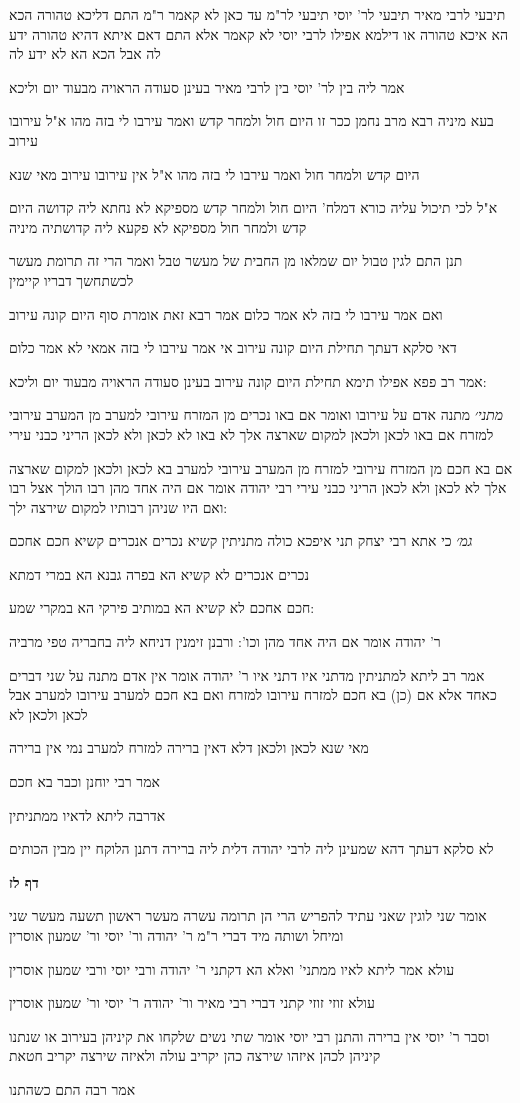 \documentclass[12pt, openany]{book}
\newcommand{\sethebfont}{
\fontsize{10.5pt}{21.0pt} \selectfont
}
\newcommand{\textblock}[1]{
{\sethebfont #1\\}	
}
\newcommand{\sectname}{}
\newcommand{\newsection}[1]{
	\addcontentsline{toc}{section}{#1}
	\renewcommand{\sectname}{#1}	
	\vspace{-\baselineskip}
	\begin{center}
		\textbf{%
\fontsize{16pt}{16pt}\selectfont
			#1}
	\end{center}
	\vspace{-\baselineskip}
	\nopagebreak
}
\begin{document}
\textblock{תיבעי לרבי מאיר תיבעי לר' יוסי תיבעי לר"מ עד כאן לא קאמר ר"מ התם דליכא טהורה הכא הא איכא טהורה או דילמא אפילו לרבי יוסי לא קאמר אלא התם דאם איתא דהיא טהורה ידע לה אבל הכא הא לא ידע לה}
\textblock{אמר ליה בין לר' יוסי בין לרבי מאיר בעינן סעודה הראויה מבעוד יום וליכא}
\textblock{בעא מיניה רבא מרב נחמן ככר זו היום חול ולמחר קדש ואמר עירבו לי בזה מהו א"ל עירובו עירוב}
\textblock{היום קדש ולמחר חול ואמר עירבו לי בזה מהו א"ל אין עירובו עירוב מאי שנא}
\textblock{א"ל לכי תיכול עליה כורא דמלח' היום חול ולמחר קדש מספיקא לא נחתא ליה קדושה היום קדש ולמחר חול מספיקא לא פקעא ליה קדושתיה מיניה}
\textblock{תנן התם לגין טבול יום שמלאו מן החבית של מעשר טבל ואמר הרי זה תרומת מעשר לכשתחשך דבריו קיימין}
\textblock{ואם אמר עירבו לי בזה לא אמר כלום אמר רבא זאת אומרת סוף היום קונה עירוב}
\textblock{דאי סלקא דעתך תחילת היום קונה עירוב אי אמר עירבו לי בזה אמאי לא אמר כלום}
\textblock{אמר רב פפא אפילו תימא תחילת היום קונה עירוב בעינן סעודה הראויה מבעוד יום וליכא:}
\textblock{{\large\emph{מתני׳}} מתנה אדם על עירובו ואומר אם באו נכרים מן המזרח עירובי למערב מן המערב עירובי למזרח אם באו לכאן ולכאן למקום שארצה אלך לא באו לא לכאן ולא לכאן הריני כבני עירי}
\textblock{אם בא חכם מן המזרח עירובי למזרח מן המערב עירובי למערב בא לכאן ולכאן למקום שארצה אלך לא לכאן ולא לכאן הריני כבני עירי רבי יהודה אומר אם היה אחד מהן רבו הולך אצל רבו ואם היו שניהן רבותיו למקום שירצה ילך:}
\textblock{{\large\emph{גמ׳}} כי אתא רבי יצחק תני איפכא כולה מתניתין קשיא נכרים אנכרים קשיא חכם אחכם}
\textblock{נכרים אנכרים לא קשיא הא בפרה גבנא הא במרי דמתא}
\textblock{חכם אחכם לא קשיא הא במותיב פירקי הא במקרי שמע:}
\textblock{ר' יהודה אומר אם היה אחד מהן וכו': ורבנן זימנין דניחא ליה בחבריה טפי מרביה}
\textblock{אמר רב ליתא למתניתין מדתני איו דתני איו ר' יהודה אומר אין אדם מתנה על שני דברים כאחד אלא אם (כן) בא חכם למזרח עירובו למזרח ואם בא חכם למערב עירובו למערב אבל לכאן ולכאן לא}
\textblock{מאי שנא לכאן ולכאן דלא דאין ברירה למזרח למערב נמי אין ברירה}
\textblock{אמר רבי יוחנן וכבר בא חכם}
\textblock{אדרבה ליתא לדאיו ממתניתין}
\textblock{לא סלקא דעתך דהא שמעינן ליה לרבי יהודה דלית ליה ברירה דתנן הלוקח יין מבין הכותים}
\newsection{דף לז}
\textblock{אומר שני לוגין שאני עתיד להפריש הרי הן תרומה עשרה מעשר ראשון תשעה מעשר שני ומיחל ושותה מיד דברי ר"מ ר' יהודה ור' יוסי ור' שמעון אוסרין}
\textblock{עולא אמר ליתא לאיו ממתני' ואלא הא דקתני ר' יהודה ורבי יוסי ורבי שמעון אוסרין}
\textblock{עולא זוזי זוזי קתני דברי רבי מאיר ור' יהודה ר' יוסי ור' שמעון אוסרין}
\textblock{וסבר ר' יוסי אין ברירה והתנן רבי יוסי אומר שתי נשים שלקחו את קיניהן בעירוב או שנתנו קיניהן לכהן איזהו שירצה כהן יקריב עולה ולאיזה שירצה יקריב חטאת}
\textblock{אמר רבה התם כשהתנו}
\end{document}
